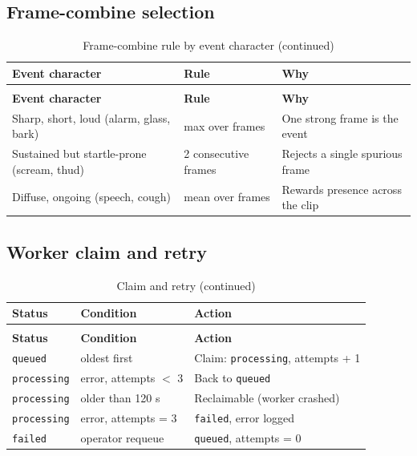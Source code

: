 \subsection{Frame-combine selection}
\begin{longtable}{L{5.0cm}L{3.6cm}L{5.4cm}}
\caption{Frame-combine rule by event character}\\
\toprule
\textbf{Event character} & \textbf{Rule} & \textbf{Why} \\
\midrule
\endfirsthead
\caption[]{Frame-combine rule by event character (continued)}\\
\toprule
\textbf{Event character} & \textbf{Rule} & \textbf{Why} \\
\midrule
\endhead
Sharp, short, loud (alarm, glass, bark) & max over frames & One strong frame is the event \\
Sustained but startle-prone (scream, thud) & 2 consecutive frames & Rejects a single spurious frame \\
Diffuse, ongoing (speech, cough) & mean over frames & Rewards presence across the clip \\
\bottomrule
\end{longtable}

\subsection{Worker claim and retry}
\begin{longtable}{L{3.4cm}L{3.0cm}L{8.2cm}}
\caption{Claim and retry}\\
\toprule
\textbf{Status} & \textbf{Condition} & \textbf{Action} \\
\midrule
\endfirsthead
\caption[]{Claim and retry (continued)}\\
\toprule
\textbf{Status} & \textbf{Condition} & \textbf{Action} \\
\midrule
\endhead
\texttt{queued} & oldest first & Claim: \texttt{processing}, attempts + 1 \\
\texttt{processing} & error, attempts $<$ 3 & Back to \texttt{queued} \\
\texttt{processing} & older than 120 s & Reclaimable (worker crashed) \\
\texttt{processing} & error, attempts = 3 & \texttt{failed}, error logged \\
\texttt{failed} & operator requeue & \texttt{queued}, attempts = 0 \\
\bottomrule
\end{longtable}

